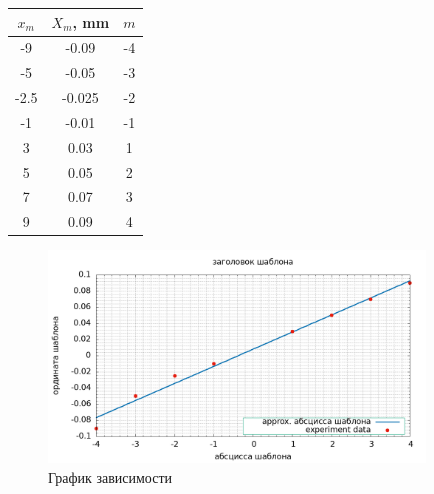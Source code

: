 \documentclass{article}
\begin{document}
    \begin{center}
        \begin{tabular}{|c|c|c|}
            \hline
            $ x_m $ & $ X_m $, mm & $ m $ \\
            \hline
            -9 & -0.09 & -4 \\
            -5 & -0.05 & -3 \\
            -2.5 & -0.025 & -2 \\
            -1 & -0.01 & -1 \\
            3 & 0.03 & 1 \\
            5 & 0.05 & 2 \\
            7 & 0.07 & 3 \\
            9 & 0.09 & 4 \\
            \hline
        \end{tabular}
    \end{center}

    \begin{figure}[ht!]
    \centering
    \includegraphics[width=100mm]{result.png}
    
    \caption{График зависимости \label{overflow}}
    \end{figure}
\end{document}
